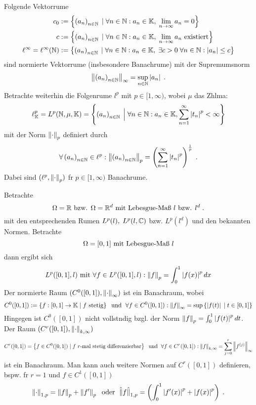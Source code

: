 \begin{ex}
	Folgende Vektorr\as ume 
	\begin{align*}
		 c_0 &:= \left\{\left (a_n\right )_{n\in \mathbb{N}} \;\vert\; \forall n \in\mathbb{N}: a_n \in \mathbb{K}, \; \lim_{n \to \infty} a_n  = 0\right\}\\
		c &:= \left\{\left (a_n\right )_{n\in \mathbb{N}} \;\vert\; \forall n\in \mathbb{N}: a_n \in \mathbb{K}, \; \lim_{n \to \infty} a_n \text{ existiert}\right\}\\
	   \ell^\infty = \ell^\infty(\mathbb{N}) &:= \left\{\left (a_n\right )_{n\in \mathbb{N}} \;\vert\; \forall n\in \mathbb{N}: a_n \in \mathbb{K},\; \exists c>0\;\forall n\in\mathbb{N}: \left\lvert a_n \right\rvert \leq c\right\}
	\end{align*}
	sind normierte Vektorr\as ume (insbesondere Banachr\as ume) mit  der Supremumsnorm 
	\[\left\lVert\left (a_n\right )_{n\in \mathbb{N}}\right\rVert_\infty = \sup_{n\in\mathbb{N}}\left\lvert a_n \right\rvert\;.\]
	Betrachte weiterhin die Folgenr\as ume \(l^p\) mit \(p \in [1,\infty)\), wobei $\mu$ das Z\as hlma\s{}:
	\[\ell_{\mathbb{K}}^p = L^p(\mathbb{N}, \mu,\mathbb{K}) = \left\{\left (a_n\right )_{n\in \mathbb{N}} \;\Big\vert\; \forall n\in \mathbb{N}: a_n \in \mathbb{K}, \sum_{n=1}^\infty \left\lvert t_n \right\rvert^p < \infty\right\}\]
	mit der Norm \(\left\lVert\cdot\right\rVert_{p}\) definiert durch
	\[\forall \left (a_n\right )_{n\in \mathbb{N}} \in \ell^p: \left\lVert\left (a_n\right )_{n\in \mathbb{N}}\right\rVert_{p} = \left(\sum_{n=1}^\infty \left\lvert t_n \right\rvert^p\right)^\frac{1}{p}\;.\]
	Dabei sind \((\ell^p, \left\lVert\cdot\right\rVert_{p})\) f\us r \(p \in [1,\infty)\) Banachr\as ume. 
\end{ex}

\begin{ex}
	\label{norm_fkt_raueme}
	Betrachte
	\[\Omega = \mathbb{R}  \text{ bzw. } \Omega = \mathbb{R}^d\text{ mit Lebesgue-Ma{\ss}{} } l \text{ bzw. } l^d\;.\]
	mit den entsprechenden R\as umen \(L^p(l), \; L^p(l,\mathbb{C})\) bzw. \(L^p(l^d)\) und den bekannten Normen.
	Betrachte 
	\[\Omega = [0,1] \text{ mit Lebesgue-Ma{\ss}{} } l \]
	dann ergibt sich 
	\[L^p([0,1],l) \text{ mit } \forall f\in L^p([0,1],l): \left\lVert f\right\rVert_{p} = \int_0^1 \left\lvert f(x) \right\rvert^p dx\]
	Der normierte Raum \((C^0([0,1]), \left\lVert\cdot\right\rVert_\infty)\) ist ein Banachraum, wobei 
	\[C^0([0,1]) := \left\{f:[0,1]\to\mathbb{K} \;\vert\; f\text{ stetig}\right\} \;\text{ und }\; \forall f \in C^0([0,1]) : \left\lVert f\right\rVert_\infty = \sup\left\{\left\lvert f(t) \right\rvert\;\vert\;t\in[0,1]\right\}\]
	Hingegen ist \(C^0([0,1])\) nicht vollst\as ndig bzgl. der Norm \(\left\lVert f\right\rVert_{p} = \int_0^1\left\lvert f(t) \right\rvert^p dt\).
	Der Raum \((C^r([0,1]), \left\lVert\cdot\right\rVert_{k,\infty})\) 
	\[C^r([0,1]) = \left\{f \in C^0([0,1])\;\vert\; f \text{ $r$-mal stetig differenzierbar}\right\} \;\text{ und }\; \forall f\in C^r([0,1]): \left\lVert f\right\rVert_{k, \infty} = \sum_{j=0}^r \left\lVert f^{(j)}\right\rVert_\infty\]
	 ist ein Banachraum. Man kann auch weitere Normen auf \(C^r([0,1])\) definieren, bspw. f\us r \(r=1\) und \(f\in C^1([0,1])\)
	 \[\left\lVert\cdot\right\rVert_{1,p} = \left\lVert f\right\rVert_{p} + \left\lVert f'\right\rVert_{p} \;\text{ oder }\; \hat\lVert f\hat\rVert_{1,p} = \left(\int_0^1 \left\lvert f'(x) \right\rvert^p + \left\lvert f(x) \right\rvert^p\right)\;.\]
	\end{ex}
	
